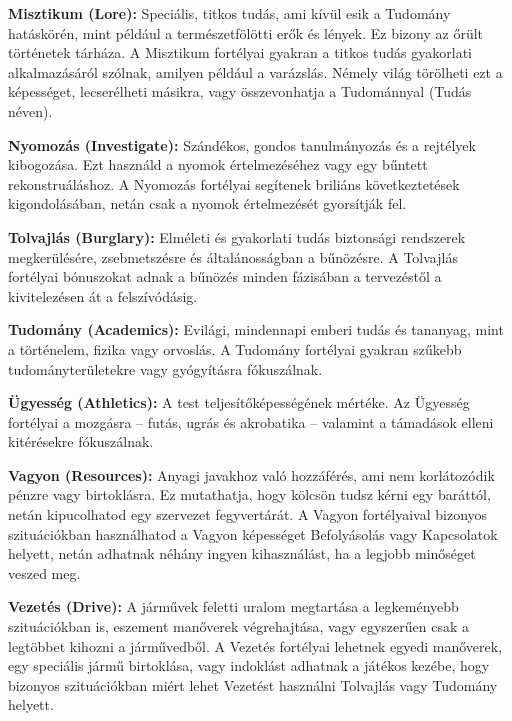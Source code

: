 \textbf{Misztikum (Lore):} Speciális, titkos tudás, ami kívül esik a Tudomány hatáskörén, mint például a természetfölötti erők és lények. Ez bizony az őrült történetek tárháza. A Misztikum fortélyai gyakran a titkos tudás gyakorlati alkalmazásáról szólnak, amilyen például a varázslás. Némely világ törölheti ezt a képességet, lecserélheti másikra, vagy összevonhatja a Tudománnyal (Tudás néven).

\textbf{Nyomozás (Investigate):} Szándékos, gondos tanulmányozás és a rejtélyek kibogozása. Ezt használd a nyomok értelmezéséhez vagy egy bűntett rekonstruáláshoz. A Nyomozás fortélyai segítenek briliáns következtetések kigondolásában, netán csak a nyomok értelmezését gyorsítják fel.

\textbf{Tolvajlás (Burglary):} Elméleti és gyakorlati tudás biztonsági rendszerek megkerülésére, zsebmetszésre és általánosságban a bűnözésre. A Tolvajlás fortélyai bónuszokat adnak a bűnözés minden fázisában a tervezéstől a kivitelezésen át a felszívódásig.

\textbf{Tudomány (Academics):} Evilági, mindennapi emberi tudás és tananyag, mint a történelem, fizika vagy orvoslás. A Tudomány fortélyai gyakran szűkebb tudományterületekre vagy gyógyításra fókuszálnak.

\textbf{Ügyesség (Athletics):} A test teljesítőképességének mértéke. Az Ügyesség fortélyai a mozgásra – futás, ugrás és akrobatika – valamint a támadások elleni kitérésekre fókuszálnak.

\textbf{Vagyon (Resources):} Anyagi javakhoz való hozzáférés, ami nem korlátozódik pénzre vagy birtoklásra.  Ez mutathatja, hogy kölcsön tudsz kérni egy baráttól, netán kipucolhatod egy szervezet fegyvertárát. A Vagyon fortélyaival bizonyos szituációkban használhatod a Vagyon képességet Befolyásolás vagy Kapcsolatok helyett, netán adhatnak néhány ingyen kihasználást, ha a legjobb minőséget veszed meg.

\textbf{Vezetés (Drive):} A járművek feletti uralom megtartása a legkeményebb szituációkban is, eszement manőverek végrehajtása, vagy egyszerűen csak a legtöbbet kihozni a járművedből. A Vezetés fortélyai lehetnek egyedi manőverek, egy speciális jármű birtoklása, vagy indoklást adhatnak a játékos kezébe, hogy bizonyos szituációkban miért lehet Vezetést használni Tolvajlás vagy Tudomány helyett.
